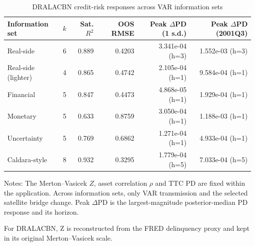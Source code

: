 \begin{table}[!htbp]
\centering
\caption{DRALACBN credit-risk responses across VAR information sets}
\label{tab:dralacbn_information_set_robustness}
\begin{tabular}{lrrrrr}
\toprule
Information set & $k$ & Sat. $R^2$ & OOS RMSE & Peak $\Delta$PD (1 s.d.) & Peak $\Delta$PD (2001Q3) \\
\midrule
Real-side & 6 & 0.889 & 0.4203 & 3.341e-04 (h=3) & 1.552e-03 (h=3) \\
Real-side (lighter) & 4 & 0.865 & 0.4742 & 2.105e-04 (h=1) & 9.584e-04 (h=1) \\
Financial & 5 & 0.847 & 0.4473 & 4.868e-05 (h=1) & 1.929e-04 (h=1) \\
Monetary & 5 & 0.633 & 0.8759 & 3.050e-04 (h=1) & 1.188e-03 (h=1) \\
Uncertainty & 5 & 0.769 & 0.6862 & 1.271e-04 (h=1) & 4.933e-04 (h=1) \\
Caldara-style & 8 & 0.932 & 0.3295 & 1.779e-04 (h=5) & 7.033e-04 (h=5) \\
\bottomrule
\end{tabular}
\begin{tablenotes}
\small
\item Notes: The Merton--Vasicek $Z$, asset correlation $\rho$ and TTC PD are fixed within the application. Across information sets, only VAR transmission and the selected satellite bridge change. Peak $\Delta$PD is the largest-magnitude posterior-median PD response and its horizon.
\item For DRALACBN, Z is reconstructed from the FRED delinquency proxy and kept in its original Merton--Vasicek scale.
\end{tablenotes}
\end{table}
